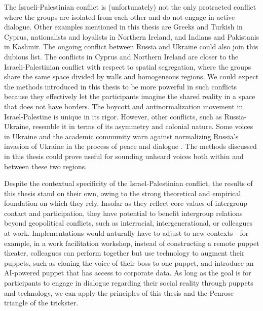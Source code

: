 \documentclass[dissertation,math,vertlayout,pdfa,colorlinks,nologo]{aaltoseries}
\begin{document}
The Israeli-Palestinian conflict is (unfortunately) not the only protracted conflict where the groups are isolated from each other and do not engage in active dialogue. Other examples mentioned in this thesis are Greeks and Turkish in Cyprus, nationalists and loyalists in Northern Ireland, and Indians and Pakistanis in Kashmir. The ongoing conflict between Russia and Ukraine could also join this dubious list. The conflicts in Cyprus and Northern Ireland are closer to the Israeli-Palestinian conflict with respect to spatial segregation, where the groups share the same space divided by walls and homogeneous regions. We could expect the methods introduced in this thesis to be more powerful in such conflicts because they effectively let the participants imagine the shared reality in a space that does not have borders. The boycott and antinormalization movement in Israel-Palestine is unique in its rigor. However, other conflicts, such as Russia-Ukraine, resemble it in terms of its asymmetry and colonial nature. Some voices in Ukraine and the academic community warn against normalizing Russia's invasion of Ukraine in the process of peace and dialogue \cite{makarychevNormalizeRationalizeIntellectuals2023}. The methods discussed in this thesis could prove useful for sounding unheard voices both within and between these two regions. 

Despite the contextual specificity of the Israel-Palestinian conflict, the results of this thesis stand on their own, owing to the strong theoretical and empirical foundation on which they rely. Insofar as they reflect core values of intergroup contact and participation, they have potential to benefit intergroup relations beyond geopolitical conflicts, such as interracial, intergenerational, or colleagues at work. Implementations would naturally have to adjust to new contexts - for example, in a work facilitation workshop, instead of constructing a remote puppet theater, colleagues can perform together but use technology to augment their puppets, such as cloning the voice of their boss to one puppet, and introduce an AI-powered puppet that has access to corporate data. As long as the goal is for participants to engage in dialogue regarding their social reality through puppets and technology, we can apply the principles of this thesis and the Penrose triangle of the trickster.
\end{document}
